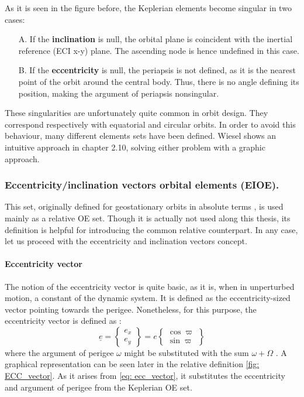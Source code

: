 	\FloatBarrier
	\indent As it is seen in the figure before, the Keplerian elements become singular in two cases:
	\begin{itemize}
	\item[A.] If the \textbf{inclination} is null, the orbital plane is coincident with the inertial reference (ECI x-y) plane. The ascending node is hence undefined in this case. 
	\item[B.] If the \textbf{eccentricity} is null, the periapsis is not defined, as it is the nearest point of the orbit around the central body. Thus, there is no angle defining its position, making the argument of periapsis nonsingular. 
	\end{itemize}
	\indent These singularities are unfortunately quite common in orbit design. They correspond respectively with equatorial and circular orbits. In order to avoid this behaviour, many different elements sets have been defined. Wiesel \cite{Wiesel} shows an intuitive approach in chapter 2.10, solving either problem with a graphic approach.
	\subsubsection{Eccentricity/inclination vectors orbital elements (EIOE).}\label{sec: EIOE}
	\indent This set, originally defined for geostationary orbits in absolute terms \cite{Eckstein}, is used mainly as a relative OE set. Though it is actually not used along this thesis, its definition is helpful for introducing the common relative counterpart.  In any case, let us proceed with the eccentricity and inclination vectors concept.
	\paragraph{Eccentricity vector \\}
	\indent The notion of the eccentricity vector is quite basic, as it is, when in unperturbed motion, a constant of the dynamic system. It is defined as the eccentricity-sized vector pointing towards the perigee. Nonetheless, for this purpose, the eccentricity vector is defined as \cite{DAmico_Montenbruck}:
	\begin{equation}
	\underline{e} = 
	\left\{ 
	\begin{array}{c}
	e_x \\[1.5em]
	e_y
	\end{array}
	\right\} = e
	\left\{ 
	\begin{array}{c}
	\cos\varpi \\[1.5em]
	\sin\varpi
	\end{array}
	\right\}
	\label{eq: 	ecc_vector}
	\end{equation}
	\noindent where the argument of perigee $\omega$ might be substituted with the sum $\omega + \Omega$ \cite[as in][]{Eckstein}. A graphical representation can be seen later in the relative definition \ref{fig: 	ECC_vector}. As it arises from \eqref{eq: 	ecc_vector}, it substitutes the eccentricity and argument of perigee from the Keplerian OE set.
